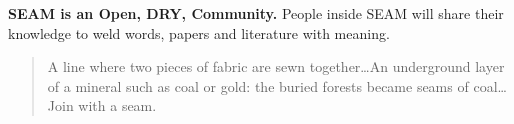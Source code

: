 \documentclass[
	a0,
	portrait
	]{a0poster}
\begin{document}
\begin{multicols}{4}
\textbf{SEAM is an Open, DRY, Community.} People inside SEAM will share their knowledge to weld words, papers and literature with meaning.

\vfill

\begin{quotation}
\begin{it}
\begin{flushright}
A line where two pieces of fabric are sewn together\ldots An underground layer of a mineral such as coal or gold: the buried forests became seams of coal\ldots Join with a seam.
\end{flushright}
\end{it}
\end{quotation}

\end{multicols}
\end{document}
